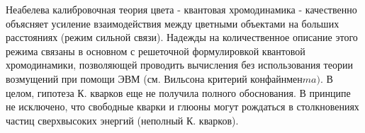 \documentclass[10pt]{article}
\begin{document}
Неабелева калибровочная теория цвета - квантовая хромодинамика - качественно объясняет усиление взаимодействия между цветными объектами на больших расстояниях (режим сильной связи). Надежды на количественное описание этого режима связаны в основном с решеточной формулировкой квантовой хромодинамики, позволяющей проводить вычисления без использования теории возмущений при помощи ЭВМ (см. Вильсона критерий конфайнмен$m a)$. В целом, гипотеза К. кварков еще не получила полного обоснования. В принципе не исключено, что свободные кварки и глюоны могут рождаться в столкновениях частиц сверхвысоких энергий (неполный К. кварков).
\end{document}

